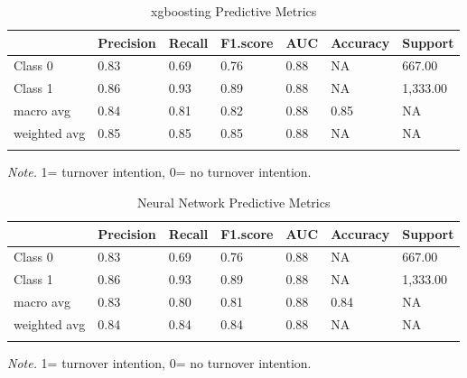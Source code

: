\documentclass[
  man]{apa7}
\begin{document}
\begin{table}[tbp]

\begin{center}
\begin{threeparttable}

\caption{\label{tab:xgbtable10k}xgboosting Predictive Metrics}

\begin{tabular}{lllllll}
\toprule
 & \multicolumn{1}{c}{Precision} & \multicolumn{1}{c}{Recall} & \multicolumn{1}{c}{F1.score} & \multicolumn{1}{c}{AUC} & \multicolumn{1}{c}{Accuracy} & \multicolumn{1}{c}{Support}\\
\midrule
Class 0 & 0.83 & 0.69 & 0.76 & 0.88 & NA & 667.00\\
Class 1 & 0.86 & 0.93 & 0.89 & 0.88 & NA & 1,333.00\\
macro avg & 0.84 & 0.81 & 0.82 & 0.88 & 0.85 & NA\\
weighted avg & 0.85 & 0.85 & 0.85 & 0.88 & NA & NA\\
\bottomrule
\addlinespace
\end{tabular}

\begin{tablenotes}[para]
\normalsize{\textit{Note.} 1= turnover intention, 0= no turnover intention.}
\end{tablenotes}

\end{threeparttable}
\end{center}

\end{table}

\begin{table}[tbp]

\begin{center}
\begin{threeparttable}

\caption{\label{tab:nn10k}Neural Network Predictive Metrics}

\begin{tabular}{lllllll}
\toprule
 & \multicolumn{1}{c}{Precision} & \multicolumn{1}{c}{Recall} & \multicolumn{1}{c}{F1.score} & \multicolumn{1}{c}{AUC} & \multicolumn{1}{c}{Accuracy} & \multicolumn{1}{c}{Support}\\
\midrule
Class 0 & 0.83 & 0.69 & 0.76 & 0.88 & NA & 667.00\\
Class 1 & 0.86 & 0.93 & 0.89 & 0.88 & NA & 1,333.00\\
macro avg & 0.83 & 0.80 & 0.81 & 0.88 & 0.84 & NA\\
weighted avg & 0.84 & 0.84 & 0.84 & 0.88 & NA & NA\\
\bottomrule
\addlinespace
\end{tabular}

\begin{tablenotes}[para]
\normalsize{\textit{Note.} 1= turnover intention, 0= no turnover intention.}
\end{tablenotes}

\end{threeparttable}
\end{center}

\end{table}
\end{document}
